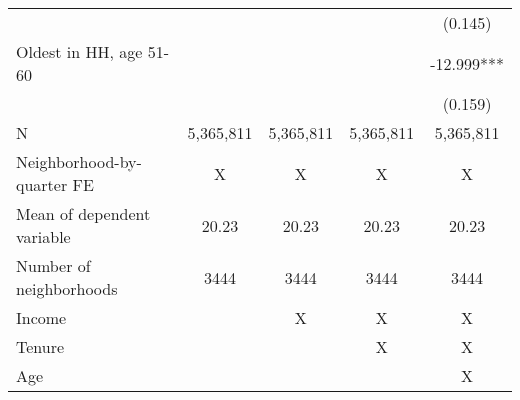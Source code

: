 \begin{tabular}{lcccc}
 &  &  &  & (0.145) \\ 
Oldest in HH, age 51-60 &  &  &  & -12.999*** \\ 
 &  &  &  & (0.159) \\ 
N & 5,365,811 & 5,365,811 & 5,365,811 & 5,365,811 \\ 
Neighborhood-by-quarter FE & X & X & X & X \\ 
Mean of dependent variable & 20.23 & 20.23 & 20.23 & 20.23 \\ 
Number of neighborhoods & 3444 & 3444 & 3444 & 3444 \\ 
Income &  & X & X & X \\ 
Tenure &  &  & X & X \\ 
Age &  &  &  & X \\ 
\bottomrule
\end{tabular}
